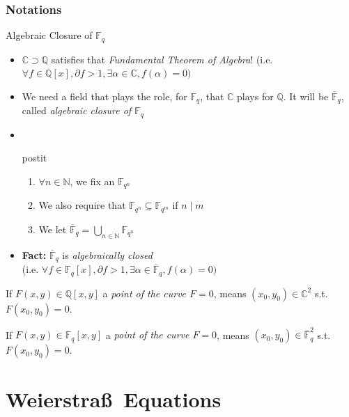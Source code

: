 \documentclass[10pt,handout]{beamer} %
\newcommand{\Q}{\mathbb Q}
\newcommand{\N}{\mathbb N}
\newcommand{\F}{\mathbb F}
\newcommand{\C}{\mathbb C}
\theoremstyle{definition}
\begin{document}
\begin{frame}[label=current]
\frametitle{Notations}
%
 \begin{block}{Algebraic Closure of $\F_q$}\pause
 \begin{itemize}[<+-| alert@+>] %
  \item $\C\supset\Q$ satisfies that \emph{Fundamental Theorem of Algebra}! (i.e. $\forall f\in\Q[x], \partial f>1, \exists\alpha\in\C,
 f(\alpha)=0)$
  \item We need a field that plays the role, for $\F_q$, that $\C$ plays for $\Q$. It will be $\overline{\F}_q$, called
\emph{algebraic closure of $\F_q$}
 \item[] \ \hfil 
 \begin{beamercolorbox}[rounded=true,shadow=true,wd=6.5cm]{postit}
         \begin{enumerate}
          \item $\forall n\in\N$, we fix an $\F_{q^n}$
          \item We also require that $\F_{q^n}\subseteq\F_{q^m}$ if $n\mid m$
          \item We let $\overline{\F}_q=\displaystyle\bigcup_{n\in\N}\F_{q^n}$
         \end{enumerate}
\end{beamercolorbox}
 \item
  \textbf{Fact:} $\overline{\F}_q$ is \emph{algebraically closed}\\ (i.e. $\forall f\in\F_q[x], \partial f>1, \exists\alpha\in\overline{\F}_q,
 f(\alpha)=0)$
 \end{itemize}
 \end{block}

If $F(x,y)\in\Q[x,y]$ a \emph{point of the curve $F=0$}, means $(x_0,y_0)\in\C^2$ s.t.
$F(x_0,y_0)=0$. \pause

If $F(x,y)\in\F_q[x,y]$ a \emph{point of the curve $F=0$}, means $(x_0,y_0)\in\overline{\F}_q^2$ s.t.
$F(x_0,y_0)=0$.
\end{frame}


\section{Weierstra\ss\ Equations}
\end{document}
